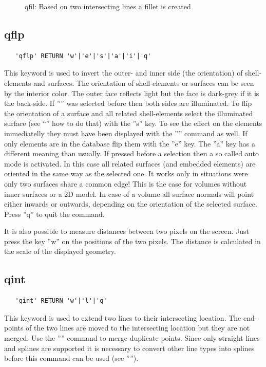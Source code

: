 \documentclass{article}
\begin{document}
\begin{figure}[h]
\caption{\label{qfilp}qfil: Based on two intersecting lines a fillet is created }
\end{figure}

\subsection{\label{qflp}qflp}
\begin{verbatim}
   'qflp' RETURN 'w'|'e'|'s'|'a'|'i'|'q'
\end{verbatim}
This keyword is used to invert the outer- and inner side (the orientation) of shell-elements and surfaces. The orientation of shell-elements or surfaces can be seen by the interior color. The outer face reflects light but the face is dark-grey if it is the back-side. If '''' was selected before then both sides are illuminated. To flip the orientation of a surface and all related shell-elements select the illuminated surface (see ``'' how to do that) with the ''s'' key. To see the effect on the elements immediatelly they must have been displayed with the '''' command as well. If only elements are in the database flip them with the ''e'' key. The ''a'' key has a different meaning than usually. If pressed before a selection then a so called auto mode is activated. In this case all related surfaces (and embedded elements) are oriented in the same way as the selected one. It works only in situations were only two surfaces share a common edge! This is the case for volumes without inner surfaces or a 2D model. In case of a volume all surface normals will point either inwards or outwards, depending on the orientation of the selected surface. Press ''q'' to quit the command. 

It is also possible to measure distances between two pixels on the screen. Just press the key ''w'' on the positions of the two pixels. The distance is calculated in the scale of the displayed geometry.

\subsection{\label{qint}qint}
\begin{verbatim}
   'qint' RETURN 'w'|'l'|'q'
\end{verbatim}
This keyword is used to extend two lines to their intersecting location. The end-points of the two lines are moved to the intersecting location but they are not merged. Use the '''' command to merge duplicate points. Since only straight lines and splines are supported it is necessary to convert other line types into splines before this command can be used (see '''').
\end{document}
